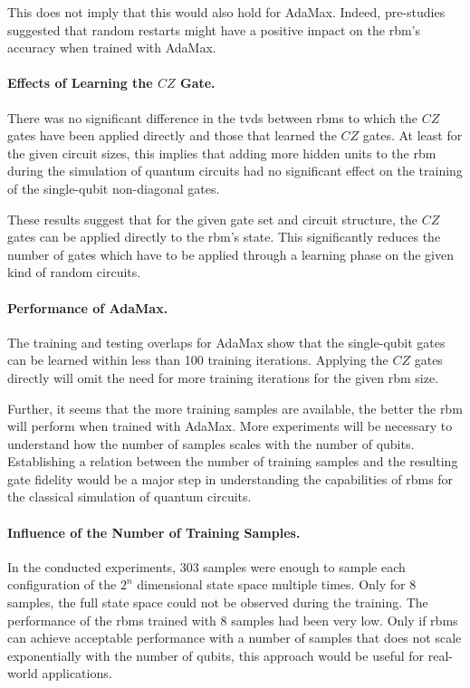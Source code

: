 This does not imply that this would also 
hold for AdaMax. Indeed, pre-studies suggested that random restarts might have a positive 
impact on the \gls{rbm}'s accuracy when trained with AdaMax.

\paragraph{Effects of Learning the $CZ$ Gate.}
There was no significant difference in the \gls{tvd}s between \gls{rbm}s to which the $CZ$ gates have 
been applied directly and those that learned the $CZ$ gates. At least for the given circuit 
sizes, this implies that adding more hidden units to the \gls{rbm} during the simulation of 
quantum circuits had no significant effect on the training of the single-qubit non-diagonal 
gates. 

These results suggest that for the given gate set and circuit structure, the $CZ$ gates can 
be applied directly to the \gls{rbm}'s state. This significantly reduces the number of gates which 
have to be applied through a learning phase on the given kind of random circuits.

\paragraph{Performance of AdaMax.}
The training and testing overlaps for AdaMax show that the single-qubit gates can 
be learned within less than 100 training iterations. Applying 
the $CZ$ gates directly will omit the need for more training iterations for the given \gls{rbm} size.

Further, it seems that the more training samples are available, the better the \gls{rbm} will 
perform when trained with AdaMax. More experiments will be necessary 
to understand how the number of samples scales with the number of qubits. Establishing
a relation between the number of training samples and the resulting gate fidelity would 
be a major step in understanding the capabilities of \gls{rbm}s for the classical simulation of 
quantum circuits.

\paragraph{Influence of the Number of Training Samples.}
In the conducted experiments, 303 samples were enough to sample each configuration of the 
$2^n$ dimensional state space multiple times. Only for 8  samples, the full state space
could not be observed during the training. The performance of the \gls{rbm}s trained with 8 samples
had been very low. Only if \gls{rbm}s can achieve acceptable performance with a number of samples 
that does not scale exponentially with the number of qubits, this approach would be useful for 
real-world applications. 

